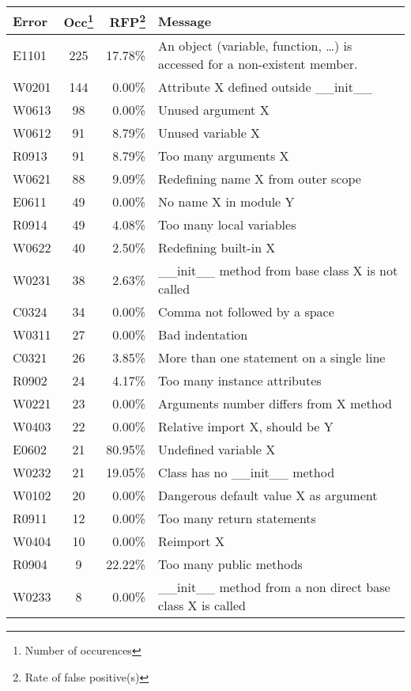 \documentclass[11pt, a4paper]{article}
\begin{document}
\begin{longtable}{|l|c|r|m{9cm}|}
\hline
\textbf{\small{Error}} & \textbf{\small{Occ\footnote{Number of occurences}}} & \textbf{\small{RFP\footnote{Rate of false positive(s)}}} & \textbf{\small{Message}} \\
\hline
\hline
E1101 & 225 & 17.78\% & An object (variable, function, \dots) is accessed for a non-existent member. \\
\hline
W0201 & 144 & 0.00\% & Attribute X defined outside \_\_init\_\_ \\
\hline
W0613 & 98 & 0.00\% & Unused argument X \\
\hline
W0612 & 91 & 8.79\% & Unused variable X \\
\hline
R0913 & 91 & 8.79\% & Too many arguments X \\
\hline
W0621 & 88 & 9.09\% & Redefining name X from outer scope \\
\hline
E0611 & 49 & 0.00\% & No name X in module Y \\
\hline
R0914 & 49 & 4.08\% & Too many local variables \\
\hline
W0622 & 40 & 2.50\% & Redefining built-in X \\
\hline
W0231 & 38 & 2.63\% & \_\_init\_\_ method from base class X is not called \\
\hline
C0324 & 34 & 0.00\% & Comma not followed by a space \\
\hline
W0311 & 27 & 0.00\% & Bad indentation \\
\hline
C0321 & 26 & 3.85\% & More than one statement on a single line \\
\hline
R0902 & 24 & 4.17\% & Too many instance attributes \\
\hline
W0221 & 23 & 0.00\% & Arguments number differs from X method \\
\hline
W0403 & 22 & 0.00\% & Relative import X, should be Y \\
\hline
E0602 & 21 & 80.95\% & Undefined variable X \\
\hline
W0232 & 21 & 19.05\% & Class has no \_\_init\_\_ method \\
\hline
W0102 & 20 & 0.00\% & Dangerous default value X as argument \\
\hline
R0911 & 12 & 0.00\% & Too many return statements \\
\hline
W0404 & 10 & 0.00\% & Reimport X \\
\hline
R0904 & 9 & 22.22\% & Too many public methods \\
\hline
W0233 & 8 & 0.00\% & \_\_init\_\_ method from a non direct base class X is called \\

\end{longtable}
\end{document}

